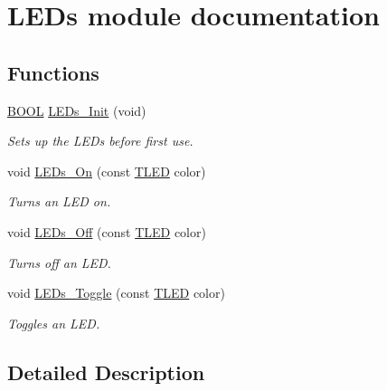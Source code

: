 \hypertarget{group___l_e_d__module}{}\section{L\+E\+Ds module documentation}
\label{group___l_e_d__module}
\subsection*{Functions}
\begin{DoxyCompactItemize}
\item 
\hyperlink{types_8h_a3e5b8192e7d9ffaf3542f1210aec18dd}{B\+O\+O\+L} \hyperlink{group___l_e_d__module_gab4a3db098400cc9a618d73df6085a2ad}{L\+E\+Ds\+\_\+\+Init} (void)
\begin{DoxyCompactList}\small\item\em Sets up the L\+E\+Ds before first use. \end{DoxyCompactList}\item 
void \hyperlink{group___l_e_d__module_ga1e5974ccd48f4e74eb3be78a51ebf16f}{L\+E\+Ds\+\_\+\+On} (const \hyperlink{_l_e_ds_8h_a833ecccaa4c55e8365e84d6c02f92ec1}{T\+L\+E\+D} color)
\begin{DoxyCompactList}\small\item\em Turns an L\+E\+D on. \end{DoxyCompactList}\item 
void \hyperlink{group___l_e_d__module_gaefecb26a8d3457bc7f7a7b2fb8b7311f}{L\+E\+Ds\+\_\+\+Off} (const \hyperlink{_l_e_ds_8h_a833ecccaa4c55e8365e84d6c02f92ec1}{T\+L\+E\+D} color)
\begin{DoxyCompactList}\small\item\em Turns off an L\+E\+D. \end{DoxyCompactList}\item 
void \hyperlink{group___l_e_d__module_ga00b9c778cd7168ea0df402b263a609bb}{L\+E\+Ds\+\_\+\+Toggle} (const \hyperlink{_l_e_ds_8h_a833ecccaa4c55e8365e84d6c02f92ec1}{T\+L\+E\+D} color)
\begin{DoxyCompactList}\small\item\em Toggles an L\+E\+D. \end{DoxyCompactList}\end{DoxyCompactItemize}


\subsection{Detailed Description}


